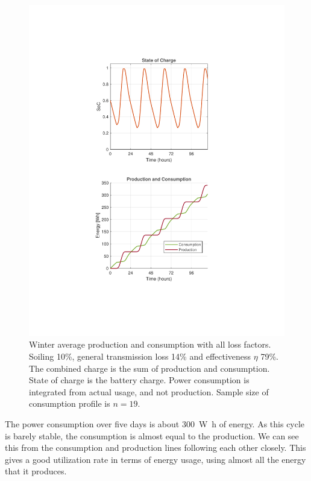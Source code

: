 \begin{figure}[H]
\begin{minipage}[t]{0.33\textwidth}
        \includegraphics[width=\linewidth]{photos/Winter_SOC&Consumption_with_all_loss_5Days.pdf} %
    \end{minipage}
    \captionsetup{font=footnotesize}
    \caption{Winter average production and consumption with all loss factors. Soiling 10\%, general transmission loss 14\% and effectiveness $\eta$ 79\%. The combined charge is the sum of production and consumption. State of charge is the battery charge. Power consumption is integrated from actual usage, and not production. Sample size of consumption profile is $n=19$.}
    \label{result:fig:Winter_40wpp_all_losses}
\end{figure}
The power consumption over five days is about \SI{300}{\watt\hour} of energy. As this cycle is barely stable, the consumption is almost equal to the production. We can see this from the consumption and production lines following each other closely. This gives a good utilization rate in terms of energy usage, using almost all the energy that it produces. 

